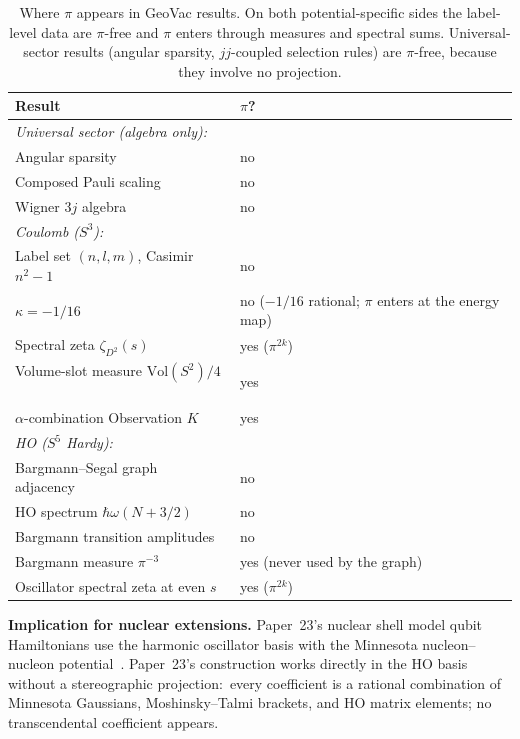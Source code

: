 \documentclass[twocolumn,pra,amsmath,amssymb,superscriptaddress]{revtex4-2}
\begin{document}
\begin{table}[h]
\caption{Where $\pi$ appears in GeoVac results.  On both
potential-specific sides the label-level data are $\pi$-free and $\pi$
enters through measures and spectral sums.  Universal-sector results
(angular sparsity, $jj$-coupled selection rules) are $\pi$-free,
because they involve no projection.}
\label{tab:pi_distribution}
\begin{ruledtabular}
\begin{tabular}{ll}
Result & $\pi$? \\
\hline
\multicolumn{2}{l}{\emph{Universal sector (algebra only):}} \\
Angular sparsity~\cite{paper22} & no \\
Composed Pauli scaling~\cite{paper14} & no \\
Wigner $3j$ algebra & no \\
\hline
\multicolumn{2}{l}{\emph{Coulomb ($S^3$):}} \\
Label set $(n,l,m)$, Casimir $n^2 - 1$~\cite{paper7} & no \\
$\kappa = -1/16$~\cite{paper7} & no ($-1/16$ rational; $\pi$ enters at the energy map) \\
Spectral zeta $\zeta_{D^2}(s)$~\cite{paper28} & yes ($\pi^{2k}$) \\
Volume-slot measure $\mathrm{Vol}(S^2)/4$~\cite{paper18} & yes \\
$\alpha$-combination Observation $K$~\cite{paper2_alpha} & yes \\
\hline
\multicolumn{2}{l}{\emph{HO ($S^5$ Hardy):}} \\
Bargmann--Segal graph adjacency~\cite{paper24} & no \\
HO spectrum $\hbar\omega(N + 3/2)$ & no \\
Bargmann transition amplitudes & no \\
Bargmann measure $\pi^{-3}$~\cite{paper24} & yes (never used by the graph) \\
Oscillator spectral zeta at even $s$~\cite{paper24} & yes ($\pi^{2k}$) \\
\end{tabular}
\end{ruledtabular}
\end{table}

\medskip\noindent\textbf{Implication for nuclear extensions.}
Paper~23's nuclear shell model qubit Hamiltonians use the harmonic
oscillator basis with the Minnesota nucleon--nucleon
potential~\cite{paper23}.  Paper~23's construction works directly in the HO basis without a
stereographic projection:\ every coefficient is a rational combination of Minnesota Gaussians,
Moshinsky--Talmi brackets, and HO matrix elements; no transcendental
coefficient appears.
\end{document}
